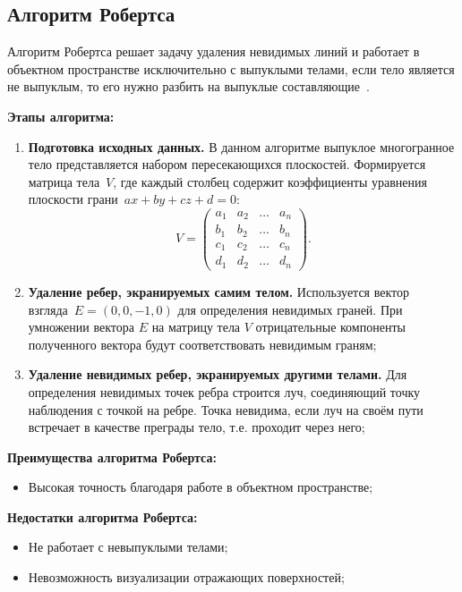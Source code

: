 \subsection{Алгоритм Робертса}

Алгоритм Робертса решает задачу удаления невидимых линий и работает в объектном пространстве исключительно с выпуклыми телами, если тело является не выпуклым, то его нужно разбить на выпуклые составляющие~\cite{rodgersCG}.

\textbf{Этапы алгоритма:}
\begin{enumerate}[label=\arabic*)]
	\item \textbf{Подготовка исходных данных.} В данном алгоритме выпуклое многогранное тело представляется набором пересекающихся плоскостей. Формируется матрица тела~$V$, где каждый столбец содержит коэффициенты уравнения плоскости грани~$ax + by + cz + d = 0$:
	\begin{equation}
		V = \begin{pmatrix}
			a_{1} & a_{2} & \ldots & a_{n}\\
			b_{1} & b_{2} & \ldots & b_{n}\\
			c_{1} & c_{2} & \ldots & c_{n}\\
			d_{1} & d_{2} & \ldots & d_{n}
		\end{pmatrix}.
	\end{equation}
	\item \textbf{Удаление ребер, экранируемых самим телом.} Используется вектор взгляда~$E = (0, 0, -1, 0)$ для определения невидимых граней. При умножении вектора $E$ на матрицу тела $V$ отрицательные компоненты полученного вектора будут соответствовать невидимым граням;
	
	\item \textbf{Удаление невидимых ребер, экранируемых другими телами.} Для определения невидимых точек ребра строится луч, соединяющий точку наблюдения с точкой на ребре. Точка невидима, если луч на своём пути встречает в качестве преграды тело, т.е. проходит через него;
\end{enumerate}

\textbf{Преимущества алгоритма Робертса:}
\begin{itemize}
	\item Высокая точность благодаря работе в объектном пространстве;
\end{itemize}

\textbf{Недостатки алгоритма Робертса:}
\begin{itemize}
	\item Не работает с невыпуклыми телами;
	\item Невозможность визуализации отражающих поверхностей;
\end{itemize}


